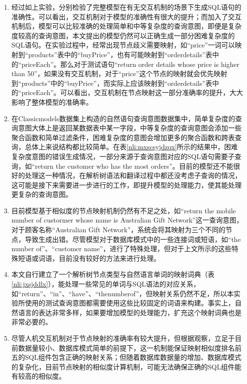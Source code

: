 \begin{enumerate}
    \item 经过如上实验，分别检验了完整模型在有无交互机制的场景下生成SQL语句的准确性。可以看出，交互机制对于模型的准确性有很大的提升；而加入了交互机制后，模型可以比较准确的处理简单和中等复杂度的查询意图，即便是复杂度较高的查询意图，本文提出的模型仍然可以正确生成一部分困难复杂度的SQL语句。在实验过程中，经常出现节点歧义需要映射，如“price”一词可以映射到“products”表中的“buyPrice”，也有可能映射到“orderdetails”表中的“priceEach”。那么对于测试语句“return order details whose price is higher than 50”，如果没有交互机制，对于“price”这个节点的映射就会优先映射到“products”中的“buyPrice”，而实际上应该映射到“orderdetails”表中的“priceEach”。可以看出，交互机制在节点映射这一部分准确率的提升，大大影响了整体模型的准确率。
    \item	在Classicmodels数据集上构造的自然语句查询意图数据集中，简单复杂度的查询意图大体上是返回某数据表中某一字段，中等复杂度的查询意图会添加一些聚合函数和简单过滤条件，困难复杂度的意图会增加更多的聚合函数和跨表查询，总体上来说结构都比较简单。在表\ref{nli:mxscsyjdzqx}所示的结果中，困难复杂度意图的错误生成情况，一部分来源于查询意图对应的SQL语句需要子查询，如“return the customer who has the most orders”。目前的模型还不能很好的处理这一种情况，在解析树语法和翻译过程中都还没考虑子查询的情况，这可能是接下来需要进一步进行的工作，即提升模型的处理能力，使其能处理更复杂的查询意图。
    \item	目前模型基于相似度的节点映射机制仍然有不足之处，如“return the mobile number of custormer whose name is Australian Gift Network”这一查询意图，对于顾客名称“Australian Gift Network”，系统会将其映射为三个不同的节点，导致生成出错。尽管模型对于数据库模式中的一些连接词或短语，如“the number of”、“customer name”，进行了特殊处理，但对于上文所示的这些特殊短语或词语，目前没有较好的方法来进行处理。
    \item	本文自行建立了一个解析树节点类型与自然语言单词的映射词典（表\ref{nli:jxsjddlx}），能处理一些常见的单词与SQL语法的对应关系，如“return”、“in”、“have”、“thenumberof”，但映射关系仍然不足，所以本实验所使用的测试查询意图都需要使用这些比较固定的词语来构建。事实上，自然语言的表达非常多样，如果要增加模型的处理能力，扩充这个映射词典也是非常必要的。
    \item	尽管人机交互机制对于节点映射的准确率有较大提升，但根据观察，立足于目前数据量较小、数据库模式简单的前提下，这一机制能保证映射相似度排名前五的SQL组件包含正确的映射关系；但随着数据库数据量的增加、数据库模式的复杂化，目前节点映射的相似度计算机制，可能无法确保正确的SQL组件能有较高的相似度。
\end{enumerate}


